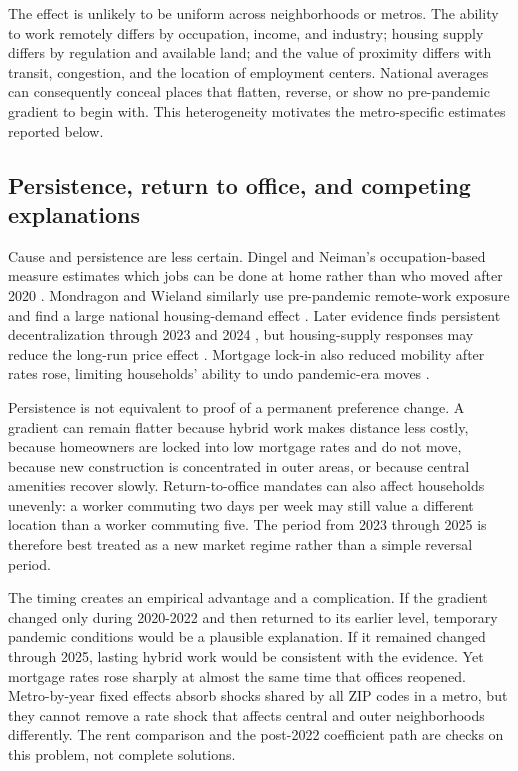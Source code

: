 \documentclass[11pt]{article}
\begin{document}
The effect is unlikely to be uniform across neighborhoods or metros. The ability to work remotely differs by occupation, income,
and industry; housing supply differs by regulation and available land; and the value of proximity differs with transit, congestion,
and the location of employment centers. National averages can consequently conceal places that flatten, reverse, or show no
pre-pandemic gradient to begin with. This heterogeneity motivates the metro-specific estimates reported below.

\subsection{Persistence, return to office, and competing explanations}

Cause and persistence are less certain. Dingel and Neiman's occupation-based measure estimates which jobs can be done at home
rather than who moved after 2020 \cite{dingel2020jobs}. Mondragon and Wieland similarly use pre-pandemic remote-work exposure and
find a large national housing-demand effect \cite{mondragon2022housing}. Later evidence finds persistent decentralization through
2023 and 2024 \cite{ramani2024reshapes}, but housing-supply responses may reduce the long-run price effect
\cite{howard2023short}. Mortgage lock-in also reduced mobility after rates rose, limiting households' ability to undo pandemic-era
moves \cite{fonseca2024mortgage}.

Persistence is not equivalent to proof of a permanent preference change. A gradient can remain flatter because hybrid work makes
distance less costly, because homeowners are locked into low mortgage rates and do not move, because new construction is
concentrated in outer areas, or because central amenities recover slowly. Return-to-office mandates can also affect households
unevenly: a worker commuting two days per week may still value a different location than a worker commuting five. The period from
2023 through 2025 is therefore best treated as a new market regime rather than a simple reversal period.

The timing creates an empirical advantage and a complication. If the gradient changed only during 2020-2022 and then returned to
its earlier level, temporary pandemic conditions would be a plausible explanation. If it remained changed through 2025, lasting
hybrid work would be consistent with the evidence. Yet mortgage rates rose sharply at almost the same time that offices reopened.
Metro-by-year fixed effects absorb shocks shared by all ZIP codes in a metro, but they cannot remove a rate shock that affects
central and outer neighborhoods differently. The rent comparison and the post-2022 coefficient path are checks on this problem,
not complete solutions.
\end{document}
